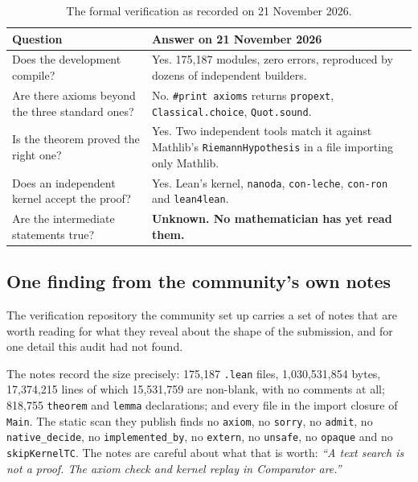 \begin{table}[H]
\centering
\caption{The formal verification as recorded on 21 November 2026.}
\label{tab:certification}
\begin{tabular}{@{}>{\RaggedRight\arraybackslash\hyphenpenalty=10000\exhyphenpenalty=10000}p{}>{\RaggedRight\arraybackslash\hyphenpenalty=10000\exhyphenpenalty=10000}p{}@{}}
\toprule
\textbf{Question} & \textbf{Answer on 21 November 2026} \\
\midrule
Does the development compile? & Yes. 175{,}187 modules, zero errors, reproduced by dozens of independent builders. \\
Are there axioms beyond the three standard ones? & No. \texttt{\#print axioms} returns \texttt{propext}, \texttt{Classical.choice}, \texttt{Quot.sound}. \\
Is the theorem proved the right one? & Yes. Two independent tools match it against Mathlib's \texttt{RiemannHypothesis} in a file importing only Mathlib. \\
Does an independent kernel accept the proof? & Yes. Lean's kernel, \texttt{nanoda}, \texttt{con-leche}, \texttt{con-ron} and \texttt{lean4lean}. \\
Are the intermediate statements true? & \textbf{Unknown. No mathematician has yet read them.} \\
\bottomrule
\end{tabular}
\end{table}

\subsection{One finding from the community's own notes}The verification repository
the community set up carries a set of notes that are worth reading for what
they reveal about the shape of the submission, and for one detail this audit
had not found.

The notes record the size precisely: 175{,}187 \texttt{.lean} files,
1{,}030{,}531{,}854 bytes, 17{,}374{,}215 lines of which 15{,}531{,}759 are
non-blank, with no comments at all; 818{,}755 \texttt{theorem} and
\texttt{lemma} declarations; and every file in the import closure of
\texttt{Main}. The static scan they publish finds no \texttt{axiom}, no
\texttt{sorry}, no \texttt{admit}, no \texttt{native\_decide}, no
\texttt{implemented\_by}, no \texttt{extern}, no \texttt{unsafe}, no
\texttt{opaque} and no \texttt{skipKernelTC}. The notes are careful about
what that is worth: \emph{``A text search is not a proof. The axiom check and
kernel replay in Comparator are.''}

